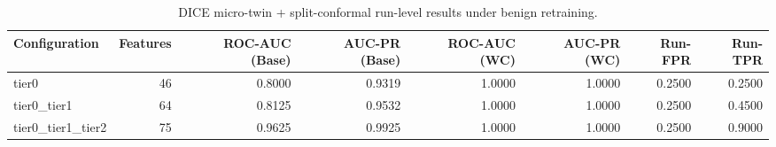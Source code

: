 \begin{table}[t]
\centering
\caption{DICE micro-twin + split-conformal run-level results under benign retraining.}
\label{tab:dice_full_overall}
\footnotesize
\begin{tabular}{lrrrrrrr}
\toprule
Configuration & Features & ROC-AUC (Base) & AUC-PR (Base) & ROC-AUC (WC) & AUC-PR (WC) & Run-FPR & Run-TPR \\
\midrule
tier0 & 46 & 0.8000 & 0.9319 & 1.0000 & 1.0000 & 0.2500 & 0.2500 \\
tier0_tier1 & 64 & 0.8125 & 0.9532 & 1.0000 & 1.0000 & 0.2500 & 0.4500 \\
tier0_tier1_tier2 & 75 & 0.9625 & 0.9925 & 1.0000 & 1.0000 & 0.2500 & 0.9000 \\
\bottomrule
\end{tabular}

\end{table}
